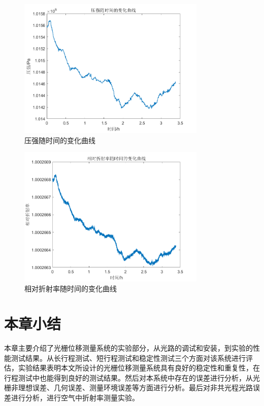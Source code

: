 \documentclass[type=master,oneside]{fduthesis}
\begin{document}
\begin{figure}[H]
  \centering
  \includegraphics[width=0.8\textwidth]{4-fig//压强随时间的变化曲线.png}
  \caption{压强随时间的变化曲线}
  \label{fig:压强随时间的变化曲线}
\end{figure}

\begin{figure}[H]
  \centering
  \includegraphics[width=0.8\textwidth]{4-fig//相对折射率随时间的变化曲线.png}
  \caption{相对折射率随时间的变化曲线}
  \label{fig:相对折射率随时间的变化曲线}
\end{figure}


\section{本章小结}
本章主要介绍了光栅位移测量系统的实验部分，从光路的调试和安装，到实验的性能测试结果。从长行程测试、短行程测试和稳定性测试三个方面对该系统进行评估，实验结果表明本文所设计的光栅位移测量系统具有良好的稳定性和重复性，在行程测试中也能得到良好的测试结果。然后对本系统中存在的误差进行分析，从光栅非理想误差、几何误差、测量环境误差等方面进行分析。最后对非共光程光路误差进行分析，进行空气中折射率测量实验。
\end{document}
